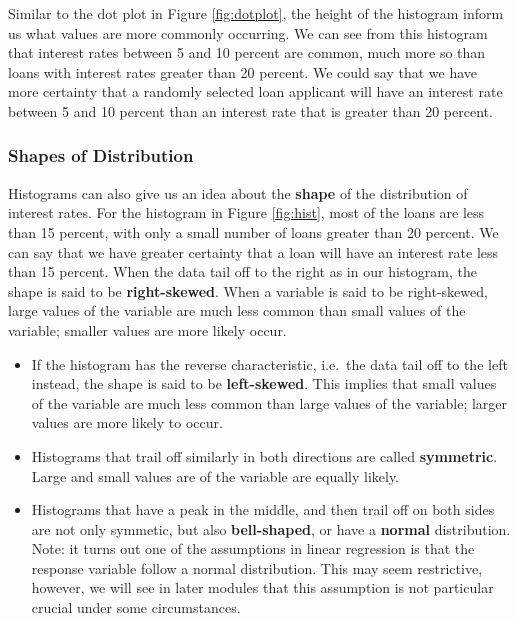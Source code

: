 \documentclass[
]{book}
\begin{document}
Similar to the dot plot in Figure \ref{fig:dotplot}, the height of the histogram inform us what values are more commonly occurring. We can see from this histogram that interest rates between 5 and 10 percent are common, much more so than loans with interest rates greater than 20 percent. We could say that we have more certainty that a randomly selected loan applicant will have an interest rate between 5 and 10 percent than an interest rate that is greater than 20 percent.

\subsubsection{Shapes of Distribution}\label{shapes-of-distribution}

Histograms can also give us an idea about the \textbf{shape} of the distribution of interest rates. For the histogram in Figure \ref{fig:hist}, most of the loans are less than 15 percent, with only a small number of loans greater than 20 percent. We can say that we have greater certainty that a loan will have an interest rate less than 15 percent. When the data tail off to the right as in our histogram, the shape is said to be \textbf{right-skewed}. When a variable is said to be right-skewed, large values of the variable are much less common than small values of the variable; smaller values are more likely occur.

\begin{itemize}
\item
  If the histogram has the reverse characteristic, i.e.~the data tail off to the left instead, the shape is said to be \textbf{left-skewed}. This implies that small values of the variable are much less common than large values of the variable; larger values are more likely to occur.
\item
  Histograms that trail off similarly in both directions are called \textbf{symmetric}. Large and small values are of the variable are equally likely.
\item
  Histograms that have a peak in the middle, and then trail off on both sides are not only symmetic, but also \textbf{bell-shaped}, or have a \textbf{normal} distribution. Note: it turns out one of the assumptions in linear regression is that the response variable follow a normal distribution. This may seem restrictive, however, we will see in later modules that this assumption is not particular crucial under some circumstances.
\end{itemize}
\end{document}
